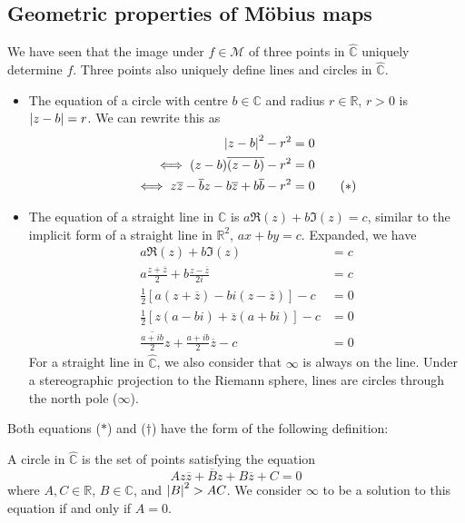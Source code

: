 \subsection{Geometric properties of M\"obius maps}
We have seen that the image under \(f \in \mathcal M\) of three points in \(\hat{\mathbb C}\) uniquely determine \(f\).
Three points also uniquely define lines and circles in \(\hat{\mathbb C}\).
\begin{itemize}
	\item The equation of a circle with centre \(b \in \mathbb C\) and radius \(r \in \mathbb R\), \(r > 0\) is \(\abs{z-b} = r\).
	      We can rewrite this as
	      \begin{align*}
		      \abs{z-b}^2 - r^2                                                        & = 0                \\
		      \iff (z-b)\overline{(z-b)} - r^2                                         & = 0                \\
		      \iff z\overline{z} - \overline{b}z - b\overline{z} + b\overline{b} - r^2 & = 0 \tag{\(\ast\)}
	      \end{align*}
	\item The equation of a straight line in \(\mathbb C\) is \(a \Re(z) + b \Im(z) = c\), similar to the implicit form of a straight line in \(\mathbb R^2\), \(ax+by=c\).
	      Expanded, we have
	      \begin{align*}
		      a \Re(z) + b \Im(z)                                                      & = c                   \\
		      a \frac{z + \overline z}{2} + b \frac{z - \overline z}{2i}               & = c                   \\
		      \frac{1}{2}\left[ a (z + \overline z) - bi (z - \overline z) \right] - c & = 0                   \\
		      \frac{1}{2}\left[ z(a-bi) + \overline z(a+bi) \right] - c                & = 0                   \\
		      \overline{\frac{a + ib}{2}}z + \frac{a+ib}{2}\overline{z} - c            & = 0 \tag{\(\dagger\)}
	      \end{align*}
	      For a straight line in \(\hat{\mathbb C}\), we also consider that \(\infty\) is always on the line.
	      Under a stereographic projection to the Riemann sphere, lines are circles through the north pole (\(\infty\)).
\end{itemize}
Both equations (\(\ast\)) and (\(\dagger\)) have the form of the following definition:
\begin{definition}
	A circle in \(\hat{\mathbb C}\) is the set of points satisfying the equation
	\[
		Az\overline z + \overline B z + B \overline z + C = 0
	\]
	where \(A, C \in \mathbb R\), \(B \in \mathbb C\), and \(\abs{B}^2 > AC\).
	We consider \(\infty\) to be a solution to this equation if and only if \(A = 0\).
\end{definition}
